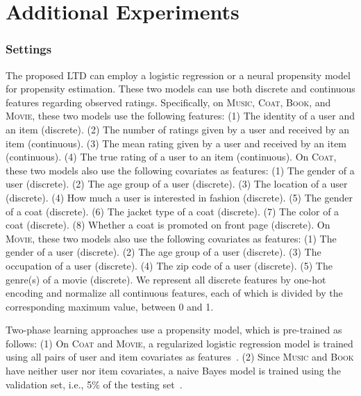 \documentclass[letterpaper]{article} %
\newcommand{\vectorize}[1]{\bm{#1}}
\newcommand{\lrdense}[2]{\smashoperator[lr]{#1_{#2}}}
\newcommand{\obsBiasedPairs}{\mathcal{B}}
\newcommand{\misBiasedPairs}{{\lnot\mathcal{B}}}
\newcommand{\featureMark}{x}
\newcommand{\biasedFeatures}{\vectorize{\featureMark}_{u,i}}
\newcommand{\likelihood}[1]{\mathcal{F}_{\rm #1}}
\newcommand{\lgBias}{b}
\newcommand{\lgWeight}{\vectorize{w}}
\newcommand{\propensityName}{q}
\newcommand{\propensityParam}{\theta}
\newcommand{\propensityModel}{\propensityName_\propensityParam(\biasedFeatures)}
\begin{document}

\section{Additional Experiments}
\label{app:additional experiments}

\subsubsection{Settings}
The proposed LTD can employ a logistic regression or a neural propensity model for propensity estimation.
These two models can use both discrete and continuous features regarding observed ratings.
Specifically, on \textsc{Music}, \textsc{Coat}, \textsc{Book}, and \textsc{Movie}, these two models use the following features:
(1) The identity of a user and an item (discrete).
(2) The number of ratings given by a user and received by an item (continuous).
(3) The mean rating given by a user and received by an item (continuous).
(4) The true rating of a user to an item (continuous).
On \textsc{Coat}, these two models also use the following covariates as features:
(1) The gender of a user (discrete).
(2) The age group of a user (discrete).
(3) The location of a user (discrete).
(4) How much a user is interested in fashion (discrete).
(5) The gender of a coat (discrete).
(6) The jacket type of a coat (discrete).
(7) The color of a coat (discrete).
(8) Whether a coat is promoted on front page (discrete).
On \textsc{Movie}, these two models also use the following covariates as features:
(1) The gender of a user (discrete).
(2) The age group of a user (discrete).
(3) The occupation of a user (discrete).
(4) The zip code of a user (discrete).
(5) The genre(s) of a movie (discrete).
We represent all discrete features by one-hot encoding and normalize all continuous features, each of which is divided by the corresponding maximum value, between 0 and 1.

Two-phase learning approaches use a propensity model, which is pre-trained as follows:
(1) On \textsc{Coat} and \textsc{Movie}, a regularized logistic regression model is trained using all pairs of user and item covariates as features~\cite{schnabel2016recommendations}.
(2) Since \textsc{Music} and \textsc{Book} have neither user nor item covariates, a naive Bayes model is trained using the validation set, i.e., 5\% of the testing set~\cite{wang2019doubly}.
\end{document}

